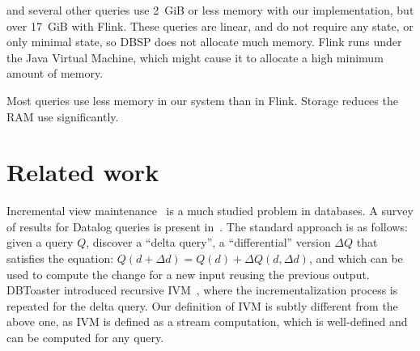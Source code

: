 \documentclass[twocolumn
]{svjour3}
\numberwithin{equation}{section}
\newcommand{\dbsp}{DBSP\xspace}
\begin{document}
 and several other queries use 2~GiB or less memory with our
implementation, but over 17~GiB with Flink.  These queries are linear,
and do not require any state, or only minimal state, so \dbsp does not
allocate much memory.  Flink runs under the Java Virtual Machine,
which might cause it to allocate a high minimum amount of memory.

Most queries use less memory in our system than in Flink.  Storage
reduces the RAM use significantly.

%
\section{Related work}\label{sec:related}

Incremental view
maintenance~\cite{buneman-actd79,blakeley-sigmod86,gupta-sigmod93,chaudhuri-icde95,gupta-idb95,chirkova-book12}
is a much studied problem in databases.  A survey of results for
Datalog queries is present in~\cite{motik-ai19}.  The standard
approach is as follows: given a query $Q$, discover a ``delta query'',
a ``differential'' version $\Delta Q$ that satisfies the equation:
$Q(d+\Delta d)=Q(d)+\Delta Q(d,\Delta d)$, and which can be used to
compute the change for a new input reusing the previous output.
DBToaster introduced recursive
IVM~\cite{ahmad-vldb09,koch-pods10,nikolic-sigmod16}, where the
incrementalization process is repeated for the delta query.  Our
definition of IVM is subtly different from the above one, as IVM is
defined as a stream computation, which is well-defined and can be
computed for any query.
\end{document}

